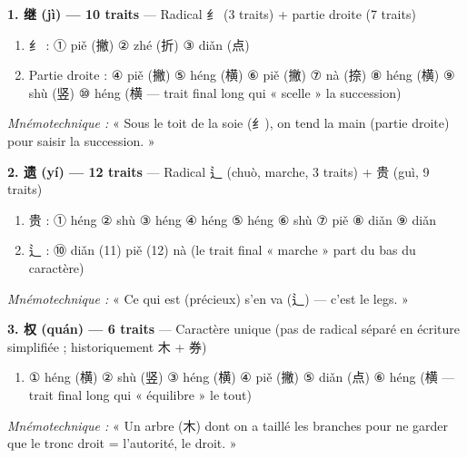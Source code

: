 \documentclass[11pt]{article}
\newcommand{\zh}[1]{\ifmmode\text{#1}\else{#1}\fi}
\begin{document}
\begin{exemplebox}
\textbf{1. 继 (jì) — 10 traits} — Radical 纟 (3 traits) + partie droite (7 traits)
\begin{enumerate}
\item 纟 : ① piě (撇) ② zhé (折) ③ diǎn (点)
\item Partie droite : ④ piě (撇) ⑤ héng (横) ⑥ piě (撇) ⑦ nà (捺) ⑧ héng (横) ⑨ shù (竖) ⑩ héng (横 — trait final long qui « scelle » la succession)
\end{enumerate}
\emph{Mnémotechnique :} « Sous le toit de la soie (纟), on tend la main (partie droite) pour saisir la succession. »

\textbf{2. 遗 (yí) — 12 traits} — Radical 辶 (chuò, marche, 3 traits) + 贵 (guì, 9 traits)
\begin{enumerate}
\item 贵 : ① héng ② shù ③ héng ④ héng ⑤ héng ⑥ shù ⑦ piě ⑧ diǎn ⑨ diǎn
\item 辶 : ⑩ diǎn (11) piě (12) nà (le trait final « marche » part du bas du caractère)
\end{enumerate}
\emph{Mnémotechnique :} « Ce qui est \zh{贵} (précieux) s'en va (辶) — c'est le legs. »

\textbf{3. 权 (quán) — 6 traits} — Caractère unique (pas de radical séparé en écriture simplifiée ; historiquement 木 + 券)
\begin{enumerate}
\item ① héng (横) ② shù (竖) ③ héng (横) ④ piě (撇) ⑤ diǎn (点) ⑥ héng (横 — trait final long qui « équilibre » le tout)
\end{enumerate}
\emph{Mnémotechnique :} « Un arbre (木) dont on a taillé les branches pour ne garder que le tronc droit = l'autorité, le droit. »
\end{exemplebox}
\end{document}
